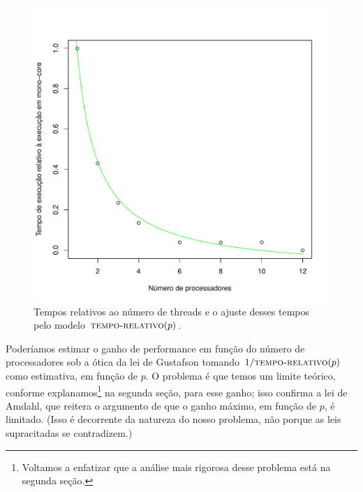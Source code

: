\documentclass[a4paper,article,10pt]{article}
\begin{document}
    \begin{figure}
      \centering
      \includegraphics[scale=0.8]{ajuste.pdf}
      \caption{Tempos relativos ao número de threads e o ajuste desses tempos
        pelo modelo $\textsc{tempo-relativo}(p)$.}
      \label{fig-ajuste}
    \end{figure}

    Poderíamos estimar o ganho de performance em função do número de
    processadores sob a ótica da lei de Gustafson tomando $1 /
    \textsc{tempo-relativo}(p)$ como estimativa, em função de $p$.
    O problema é que temos um limite teórico,
    conforme explanamos\footnote{Voltamos a enfatizar que a análise mais
      rigorosa desse problema está na segunda seção.} na segunda seção, para
    esse ganho; isso confirma a lei de Amdahl, que reitera o argumento de que o
    ganho máximo, em função de $p$, é limitado.
    (Isso é decorrente da natureza do nosso problema, não porque as leis
    supracitadas se contradizem.)

  \pagebreak
  
  
    
\end{document}
